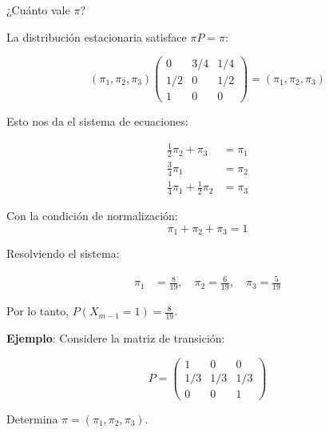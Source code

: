 \documentclass[12pt,a4paper]{article}
\begin{document}
¿Cuánto vale $\pi$?

La distribución estacionaria satisface $\pi P = \pi$:

\begin{equation*}
(\pi_1, \pi_2, \pi_3) \begin{pmatrix}
0 & 3/4 & 1/4 \\
1/2 & 0 & 1/2 \\
1 & 0 & 0
\end{pmatrix} = (\pi_1, \pi_2, \pi_3)
\end{equation*}

Esto nos da el sistema de ecuaciones:

\begin{align*}
\frac{1}{2} \pi_2 + \pi_3 &= \pi_1 \\
\frac{3}{4} \pi_1 &= \pi_2 \\
\frac{1}{4} \pi_1 + \frac{1}{2} \pi_2 &= \pi_3
\end{align*}

Con la condición de normalización:
\begin{equation}
\pi_1 + \pi_2 + \pi_3 = 1
\end{equation}

Resolviendo el sistema:

\begin{align*}
\pi_1 &= \frac{8}{19}, \quad \pi_2 = \frac{6}{19}, \quad \pi_3 = \frac{5}{19}
\end{align*}

Por lo tanto, $P(X_{m-1} = 1) = \frac{8}{19}$.

\textbf{Ejemplo}: Considere la matriz de transición:

\begin{equation*}
P = \begin{pmatrix}
1 & 0 & 0 \\
1/3 & 1/3 & 1/3 \\
0 & 0 & 1
\end{pmatrix}
\end{equation*}

Determina $\pi = (\pi_1, \pi_2, \pi_3)$.

\begin{center}
\end{center}
\end{document}
